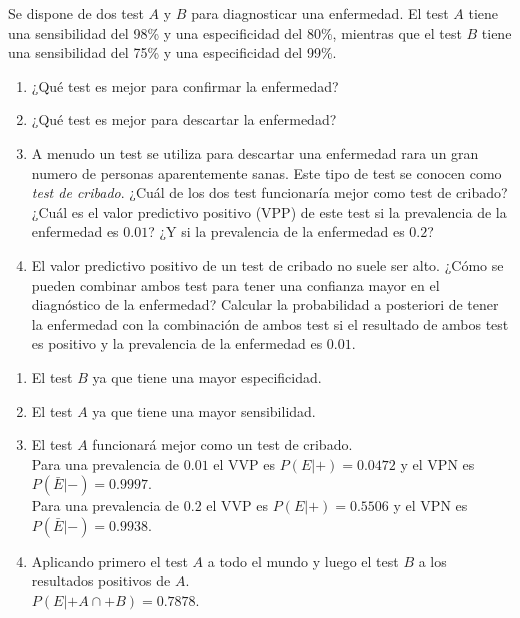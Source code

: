 {Se dispone de dos test $A$ y $B$ para diagnosticar una enfermedad.
El test $A$ tiene una sensibilidad del 98\% y una especificidad del 80\%, mientras que el test $B$ tiene una sensibilidad del 75\% y una especificidad del 99\%.
\begin{enumerate}
\item ¿Qué test es mejor para confirmar la enfermedad?
\item ¿Qué test es mejor para descartar la enfermedad?
\item A menudo un test se utiliza para descartar una enfermedad rara un gran numero de personas aparentemente sanas. 
Este tipo de test se conocen como \emph{test de cribado}.
¿Cuál de los dos test funcionaría mejor como test de cribado?
¿Cuál es el valor predictivo positivo (VPP) de este test si la prevalencia de la enfermedad es $0.01$?
¿Y si la prevalencia de la enfermedad es $0.2$?
\item El valor predictivo positivo de un test de cribado no suele ser alto.
¿Cómo se pueden combinar ambos test para tener una confianza mayor en el diagnóstico de la enfermedad?
Calcular la probabilidad a posteriori de tener la enfermedad con la combinación de ambos test si el resultado de ambos test es positivo y la prevalencia de la enfermedad es $0.01$.
\end{enumerate}
}
{
\begin{enumerate}
\item El test $B$ ya que tiene una mayor especificidad. 
\item El test $A$ ya que tiene una mayor sensibilidad. 
\item El test $A$ funcionará mejor como un test de cribado.\\  
Para una prevalencia de $0.01$ el VVP es $P(E|+)=0.0472$ y el VPN es $P(\bar E|-)=0.9997$.\\
Para una prevalencia de $0.2$ el VVP es $P(E|+)=0.5506$ y el VPN es $P(\bar E|-)=0.9938$.
\item Aplicando primero el test $A$ a todo el mundo y luego el test $B$ a los resultados positivos de $A$.\\
$P(E|+A\cap +B)=0.7878$. 
\end{enumerate}
}
{}